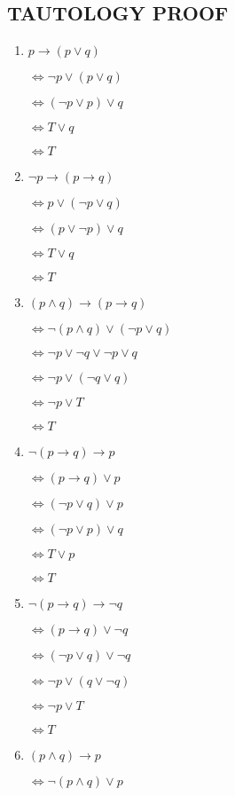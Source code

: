 \documentclass{sig-alternate-05-2015}
\begin{document}
\subsection{TAUTOLOGY PROOF}
\begin{enumerate}
\item $p\rightarrow (p\vee q )$

$\Leftrightarrow \neg p \vee (p \vee q)$

$\Leftrightarrow (\neg p \vee p) \vee q$

$\Leftrightarrow T \vee q$ 

$\Leftrightarrow T$
\item 	$\neg p \rightarrow (p\rightarrow q)$

$\Leftrightarrow p \vee (\neg p\vee q)$

$\Leftrightarrow (p \vee \neg p) \vee q$

$\Leftrightarrow T \vee q$
	
$\Leftrightarrow T$
\item $(p\wedge q)\rightarrow (p\rightarrow q)$

$\Leftrightarrow \neg (p\wedge q)\vee (\neg p\vee q)$

$\Leftrightarrow \neg p\vee \neg q\vee \neg p\vee q$

$\Leftrightarrow \neg p\vee (\neg q \vee q)$

$\Leftrightarrow \neg p\vee T$

$\Leftrightarrow  T$
\item $\neg (p\rightarrow q)\rightarrow p$

$\Leftrightarrow  (p\rightarrow q)\vee p$

$\Leftrightarrow  (\neg p\vee q)\vee p$

$\Leftrightarrow  (\neg p\vee p)\vee q$

$\Leftrightarrow  T\vee p$

$\Leftrightarrow  T$
\item $\neg (p \rightarrow q) \rightarrow \neg q$

$\Leftrightarrow  (p \rightarrow q) \vee \neg q$

$\Leftrightarrow  (\neg p \vee q) \vee \neg q$

$\Leftrightarrow  \neg p \vee (q \vee \neg q)$

$\Leftrightarrow  \neg p \vee T$

$\Leftrightarrow   T$
	
\item $(p\wedge q)\rightarrow p$

$\Leftrightarrow \neg (p\wedge q)\vee p$


\end{enumerate}
\end{document}

